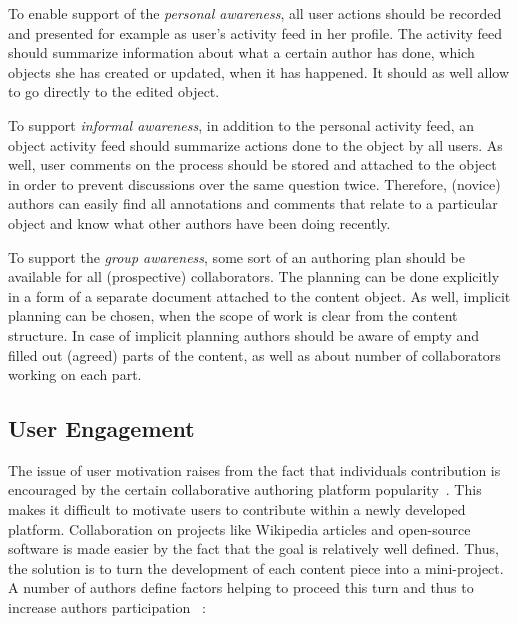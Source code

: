 \documentclass[ngerman,UKenglish,table]{scrbook}
\begin{document}
To enable support of the \emph{personal awareness}, all user actions should be recorded and presented for example as user's activity feed in her profile.
The activity feed should summarize information about what a certain author has done, which objects she has created or updated, when it has happened. 
It should as well allow to go directly to the edited object.

To support \emph{informal awareness}, in addition to the personal activity feed, an object activity feed should summarize actions done to the object by all users.
As well, user comments on the process should be stored and attached to the object in order to prevent discussions over the same question twice. 
Therefore, (novice) authors can easily find all annotations and comments that relate to a particular object and know what other authors have been doing recently.

To support the \emph{group awareness}, some sort of an authoring plan should be available for all (prospective) collaborators.
The planning can be done explicitly in a form of a separate document attached to the content object.
As well, implicit planning can be chosen, when the scope of work is clear from the content structure. 
In case of implicit planning authors should be aware of empty and filled out (agreed) parts of the content, as well as about number of collaborators working on each part.



\subsection{User Engagement}
\label{sec:user_angagement}
The issue of user motivation raises from the fact that individuals contribution is encouraged by the certain collaborative authoring platform popularity~\cite{Bruckman2008}. 
This makes it difficult to motivate users to contribute within a newly developed platform.
Collaboration on projects like Wikipedia articles and open-source software is made easier by the fact that the goal is relatively well defined.
Thus, the solution is to turn the development of each content piece into a mini-project.
A number of authors define factors helping to proceed this turn and thus to increase authors participation ~\cite{Bruckman2008, foord2007stolen}: 
\end{document}
